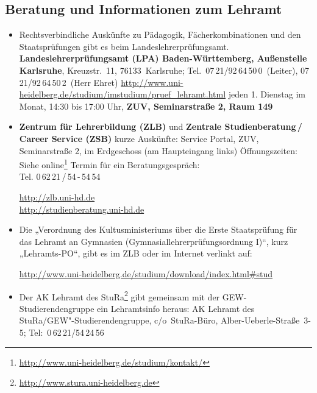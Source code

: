 \newpage\subsection{\Large Beratung und Informationen zum Lehramt}%
\begin{itemize}
\item Rechtsverbindliche Auskünfte zu Pädagogik, Fächerkombinationen und
      den Staatsprüfungen gibt es beim Landeslehrerprüfungsamt. \newline
      \textbf{Landeslehrerprüfungsamt (LPA) Baden-Württemberg,
           Außenstelle Karlsruhe},
      Kreuzstr.~11, 76133~Karlsruhe; \newline
Tel.~07\,21/92\,64\,50\,0~(Leiter), 07\,21/92\,64\,50\,2~(Herr Ehret) \newline
      \url{http://www.uni-heidelberg.de/studium/imstudium/pruef_lehramt.html} \newline
      jeden 1. Dienstag im Monat, 14:30 bis 17:00 Uhr,
      \textbf{\gls{ZUV}, Seminarstraße 2, Raum 149}


\item \textbf{Zentrum für Lehrerbildung (ZLB)} und \textbf{Zentrale Studienberatung\,/\,Career Service (ZSB)} \newline
      kurze Auskünfte: Service Portal, \gls{ZUV}, Seminarstraße 2, im Erdgeschoss (am Haupteingang links)
      Öffnungszeiten: Siehe online\footnote{\url{http://www.uni-heidelberg.de/studium/kontakt/}} \newline
      Termin für ein Beratungsgespräch: \\ Tel. 0\,62\,21\,/\,54\,-\,54\,54

      \url{http://zlb.uni-hd.de}\\
      \url{http://studienberatung.uni-hd.de}

\item Die „Verordnung des Kultusministeriums über die Erste Staatsprüfung für das
Lehramt an Gymnasien (Gymnasiallehrerprüfungsordnung I)“, kurz „Lehramts-PO“, gibt es im ZLB oder
      im Internet verlinkt auf:

      \url{http://www.uni-heidelberg.de/studium/download/index.html#stud}


\item Der AK Lehramt des StuRa\footnote{\url{http://www.stura.uni-heidelberg.de}}
      gibt gemeinsam mit der  GEW-Stu\-dier\-en\-den\-grup\-pe ein Lehramtsinfo heraus: \newline AK
      Lehramt des StuRa/GEW"-Studierendengruppe, c/o~StuRa-Büro, Alber-Ueberle-Straße~3-5; Tel:~0\,62\,21/54\,24\,56


\end{itemize}
